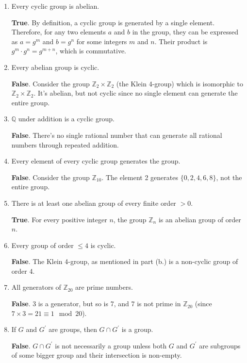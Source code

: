\documentclass[12pt]{amsart}
\theoremstyle{definition}
\numberwithin{equation}{section}
\theoremstyle{plain}
\newcommand{\Z}{\mathbb{Z}}
\newcommand{\Q}{\mathbb{Q}}
\begin{document}
    \begin{exercise}{39}
        \begin{enumerate}[label=(\alph*.)]
            \item Every cyclic group is abelian.

\textbf{True}. By definition, a cyclic group is generated by a single element. Therefore, for any two elements \(a\) and \(b\) in the group, they can be expressed as \(a = g^m\) and \(b = g^n\) for some integers \(m\) and \(n\). Their product is \(g^m \cdot g^n = g^{m+n}\), which is commutative.

\item Every abelian group is cyclic.

\textbf{False}. Consider the group \(\Z_2 \times \Z_2\) (the Klein 4-group) which is isomorphic to \(\Z_2 \times \Z_2\). It's abelian, but not cyclic since no single element can generate the entire group.

\item \(\Q\) under addition is a cyclic group.

\textbf{False}. There's no single rational number that can generate all rational numbers through repeated addition.

\item Every element of every cyclic group generates the group.

\textbf{False}. Consider the group \(\Z_{10}\). The element 2 generates \(\{0, 2, 4, 6, 8\}\), not the entire group.

\item There is at least one abelian group of every finite order \(>0\).

\textbf{True}. For every positive integer \(n\), the group \(\Z_n\) is an abelian group of order \(n\).

\item Every group of order \(\leq 4\) is cyclic.

\textbf{False}. The Klein 4-group, as mentioned in part (b.) is a non-cyclic group of order 4.

\item All generators of \(\Z_{20}\) are prime numbers.

\textbf{False}. 3 is a generator, but so is 7, and 7 is not prime in \(\Z_{20}\) (since \(7 \times 3 = 21 \equiv 1 \mod 20\)). 

\item If \(G\) and \(G^\prime\) are groups, then \(G \cap G^\prime\) is a group.

\textbf{False}. \(G \cap G^\prime\) is not necessarily a group unless both \(G\) and \(G^\prime\) are subgroups of some bigger group and their intersection is non-empty. 


\end{enumerate}
\end{exercise}
\end{document}
